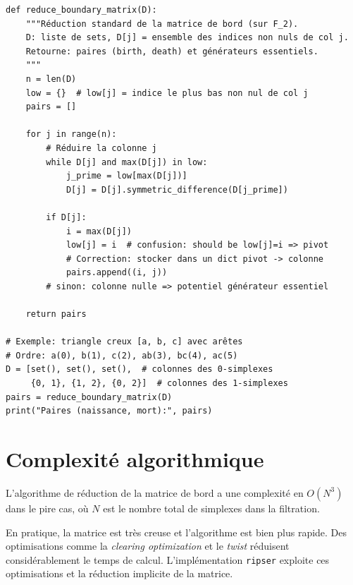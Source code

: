 \begin{codeblock}[title=\textbf{R\'eduction de matrice en Python}]
\begin{verbatim}
def reduce_boundary_matrix(D):
    """Réduction standard de la matrice de bord (sur F_2).
    D: liste de sets, D[j] = ensemble des indices non nuls de col j.
    Retourne: paires (birth, death) et générateurs essentiels.
    """
    n = len(D)
    low = {}  # low[j] = indice le plus bas non nul de col j
    pairs = []

    for j in range(n):
        # Réduire la colonne j
        while D[j] and max(D[j]) in low:
            j_prime = low[max(D[j])]
            D[j] = D[j].symmetric_difference(D[j_prime])

        if D[j]:
            i = max(D[j])
            low[j] = i  # confusion: should be low[j]=i => pivot
            # Correction: stocker dans un dict pivot -> colonne
            pairs.append((i, j))
        # sinon: colonne nulle => potentiel générateur essentiel

    return pairs

# Exemple: triangle creux [a, b, c] avec arêtes
# Ordre: a(0), b(1), c(2), ab(3), bc(4), ac(5)
D = [set(), set(), set(),  # colonnes des 0-simplexes
     {0, 1}, {1, 2}, {0, 2}]  # colonnes des 1-simplexes
pairs = reduce_boundary_matrix(D)
print("Paires (naissance, mort):", pairs)
\end{verbatim}
\end{codeblock}

\section{Complexit\'e algorithmique}

\begin{theoreme}
L'algorithme de r\'eduction de la matrice de bord a une complexit\'e
en $O(N^3)$ dans le pire cas, o\`u $N$ est le nombre total de simplexes
dans la filtration.
\end{theoreme}

\begin{remarque}
En pratique, la matrice est tr\`es creuse et l'algorithme est bien plus
rapide. Des optimisations comme la \emph{clearing optimization} et le
\emph{twist} r\'eduisent consid\'erablement le temps de calcul.
L'impl\'ementation \texttt{ripser} exploite ces optimisations et la
r\'eduction implicite de la matrice.
\end{remarque}

